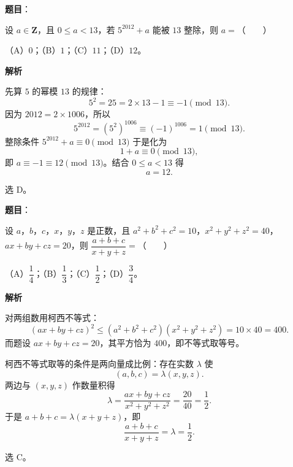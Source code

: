 \begin{answer}

\textbf{题目}：

设 $a\in\mathbf Z$，且 $0\leqslant a<13$，若 $5^{2012}+a$ 能被 $13$ 整除，则 $a=$\mbox{（　　）}

（A）$0$；（B）$1$；（C）$11$；（D）$12$。

\textbf{解析}

先算 $5$ 的幂模 $13$ 的规律：
\nopagebreak[4]
\[5^2=25=2\times13-1\equiv-1\pmod{13}.\]
因为 $2012=2\times1006$，所以
\nopagebreak[4]
\[5^{2012}=(5^2)^{1006}\equiv(-1)^{1006}=1\pmod{13}.\]
整除条件 $5^{2012}+a\equiv0\pmod{13}$ 于是化为
\nopagebreak[4]
\[1+a\equiv0\pmod{13},\]
即 $a\equiv-1\equiv12\pmod{13}$。结合 $0\leqslant a<13$ 得
\nopagebreak[4]
\[a=12.\]

选 D。


\end{answer}
\begin{answer}

\textbf{题目}：

设 $a$，$b$，$c$，$x$，$y$，$z$ 是正数，且 $a^2+b^2+c^2=10$，$x^2+y^2+z^2=40$，$ax+by+cz=20$，则 $\dfrac{a+b+c}{x+y+z}=$\mbox{（　　）}

（A）$\dfrac14$；（B）$\dfrac13$；（C）$\dfrac12$；（D）$\dfrac34$。

\textbf{解析}

对两组数用柯西不等式：
\nopagebreak[4]
\[(ax+by+cz)^2\leqslant(a^2+b^2+c^2)(x^2+y^2+z^2)=10\times40=400.\]
而题设 $ax+by+cz=20$，其平方恰为 $400$，即不等式取等号。

柯西不等式取等的条件是两向量成比例：存在实数 $\lambda$ 使
\nopagebreak[4]
\[(a,b,c)=\lambda(x,y,z).\]
两边与 $(x,y,z)$ 作数量积得
\nopagebreak[4]
\[\lambda=\frac{ax+by+cz}{x^2+y^2+z^2}=\frac{20}{40}=\frac12.\]
于是 $a+b+c=\lambda(x+y+z)$，即
\nopagebreak[4]
\[\frac{a+b+c}{x+y+z}=\lambda=\frac12.\]

选 C。


\end{answer}
